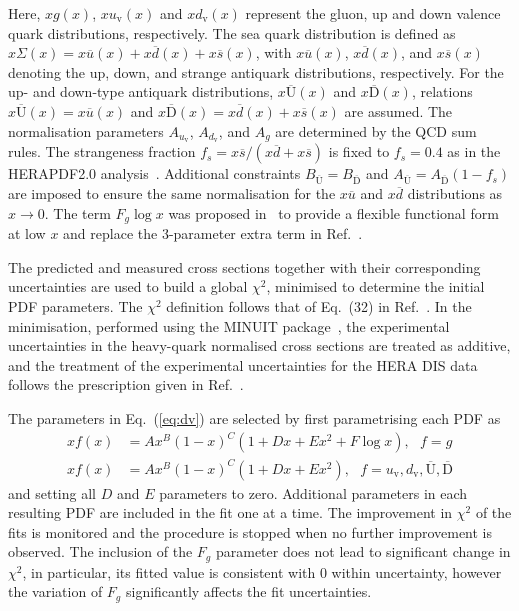 Here, $xg(x)$, $xu_{\mathrm{v}}(x)$ and $xd_{\mathrm{v}}(x)$ represent the gluon, up and down valence quark distributions, respectively. The sea quark distribution is defined as $x\Sigma(x)=x\overline{u}(x)+x\overline{d}(x)+x\overline{s}(x)$, with $x\overline{u}(x)$, $x\overline{d}(x)$, and $x\overline{s}(x)$ denoting the up, down, and strange antiquark distributions, respectively.
For the up- and down-type antiquark distributions, $x\overline{\mathrm{U}}(x)$ and $x\overline{\mathrm{D}}(x)$, relations $x\overline{\mathrm{U}}(x) = x\overline{u}(x)$ and $x\overline{\mathrm{D}}(x) = x\overline{d}(x) + x\overline{s}(x)$  are assumed.
The normalisation parameters $A_{u_{\mathrm{v}}}$, $A_{d_\mathrm{v}}$, and $A_{g}$ are determined by the QCD sum rules.
The strangeness fraction $f_{s} = x\overline{s}/( x\overline{d} + x\overline{s})$ is fixed to
$f_{s}=0.4$ as in the HERAPDF2.0 analysis~\cite{Abramowicz:2015mha}.
Additional constraints $B_{\overline{\mathrm{U}}} = B_{\overline{\mathrm{D}}}$ and $A_{\overline{\mathrm{U}}} = A_{\overline{\mathrm{D}}}(1 - f_{s})$ are imposed to ensure the same normalisation for the $x\overline{u}$ and $x\overline{d}$ distributions as $x \to 0$.
The term $F_g\log x$ was proposed in~\cite{Bonvini:2019wxf} to provide a flexible functional form at low $x$ and replace the 3-parameter extra term in Ref.~\cite{Abramowicz:2015mha}.

The predicted and measured cross sections together with their corresponding uncertainties are used to build a global $\chi^2$, minimised to determine the initial PDF
parameters. The $\chi^2$ definition follows that of Eq.~(32) in Ref.~\cite{Abramowicz:2015mha}. In the minimisation, performed 
using the MINUIT package~\cite{James:1975dr}, the experimental uncertainties in the heavy-quark normalised cross 
sections are treated as additive, and the treatment of the experimental uncertainties for the HERA DIS data follows 
the prescription given in Ref.~\cite{Abramowicz:2015mha}.

The parameters in Eq.~(\ref{eq:dv}) are selected by first parametrising each PDF as
\begin{equation}
\begin{split}
xf(x) &= Ax^B(1-x)^C(1+Dx+Ex^2+F {\log x}), ~~~f=g\\
xf(x) &= Ax^B(1-x)^C(1+Dx+Ex^2), 
~~~f=u_\mathrm{v},d_\mathrm{v},\overline{\mathrm{U}},\overline{\mathrm{D}}
\end{split}
\label{eq:de}
\end{equation}
and setting all $D$ and $E$ parameters to zero.
Additional parameters in each resulting PDF are included in the fit one at a time. 
The improvement in $\chi^2$ of the fits is monitored and the procedure is stopped when no further improvement is observed. The inclusion of the $F_{g}$ parameter does not lead to significant change in $\chi^2$, in particular, its fitted value is consistent with $0$ within uncertainty, however the variation of $F_{g}$ significantly affects the fit uncertainties.

